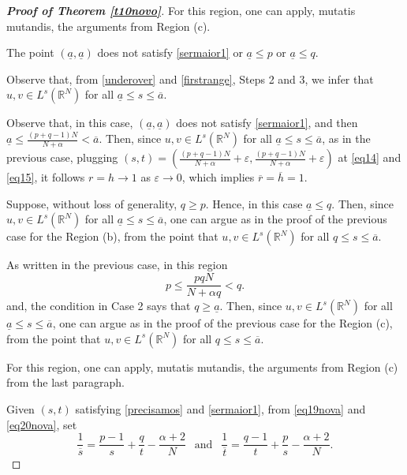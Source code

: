 \documentclass[12pt,a4paper]{article}
\numberwithin{equation}{section}
\begin{document}
\begin{proof}[\bf{Proof of Theorem \ref{t10novo}}]
\medbreak

 For this region, one can apply, mutatis mutandis, the arguments from Region (c).

\medbreak

 The point $(\underline{a}, \underline{a})$ does not satisfy \eqref{sermaior1} or $\underline{a}\leq p$ or $\underline{a} \leq q$.

Observe that,  from \eqref{underover} and \eqref{firstrange}, Steps 2 and 3, we infer that $u,v\in L^s(\mathbb{R}^N)$ for all $\underline{a} \leq s  \leq \overline{a}$.

\medbreak
{} Observe that, in this case, $(\underline{a}, \underline{a})$ does not satisfy \eqref{sermaior1}, and then $\underline{a} \leq \frac{(p+q-1)N}{N+\alpha}< \overline{a}$. Then, since  $u,v\in L^s(\mathbb{R}^N)$ for all $\underline{a} \leq s  \leq \overline{a}$, as in the previous case, plugging \linebreak $(s,t) = \left( \frac{(p+q-1)N}{N+\alpha} +\varepsilon,\frac{(p+q-1)N}{N+\alpha} +\varepsilon \right)$ at \eqref{eq14} and \eqref{eq15}, it follows $r=h\to 1$ as $\varepsilon \to 0$, which implies  $\overline{r} = \overline{h}=1$.

\medbreak

 Suppose, without loss of generality, $q\geq p$. Hence, in this case $\underline{a} \leq q$. Then, since $u,v\in L^s(\mathbb{R}^N)$ for all $\underline{a} \leq s  \leq \overline{a}$, one can argue as in the proof of the previous case for the Region (b), from the point that $u,v\in L^s(\mathbb{R}^N)$ for all $q \leq s  \leq \overline{a}$. 


\medbreak
{} As written in the previous case, in this region
\[
p \leq \frac{pqN}{N+\alpha q}<q.
\]
and, the condition in Case 2 says that $q\geq \underline{a}$. Then, since $u,v\in L^s(\mathbb{R}^N)$ for all $\underline{a} \leq s  \leq \overline{a}$, one can argue as in the proof of the previous case for the Region (c), from the point that $u,v\in L^s(\mathbb{R}^N)$ for all $q \leq s  \leq \overline{a}$. 

\medbreak

 For this region, one can apply, mutatis mutandis, the arguments from Region (c) from the last paragraph.

\medbreak
{}

Given $(s,t)$ satisfying \eqref{precisamos} and \eqref{sermaior1}, from \eqref{eq19nova} and \eqref{eq20nova}, set
\begin{equation}\label{stoverline}
\dfrac{1}{\overline{s}} = \dfrac{p-1}{s} + \dfrac{q}{t} - \dfrac{\alpha+2}{N} \ \ \text{ and } \ \ \dfrac{1}{\overline{t}} = \dfrac{q-1}{t} + \dfrac{p}{s} - \dfrac{\alpha+2}{N}.
\end{equation}


\end{proof}
\end{document}

